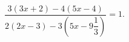 \begin{ex}[type=equation]
	\begin{condition}
		$\dfrac{3(3x+2)-4(5x - 4)}{2(2x-3)-3\left(5x - 9\dfrac{1}{3}\right)} = 1.$
	\end{condition}
\end{ex}